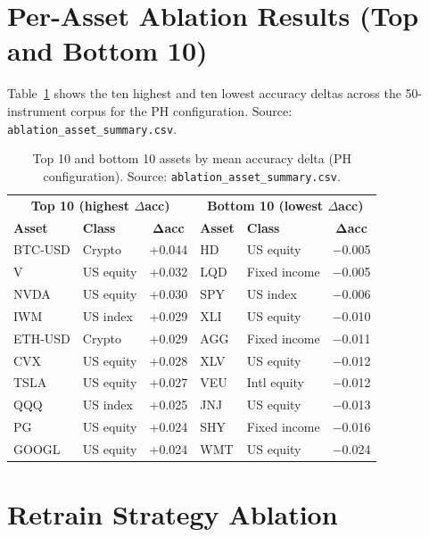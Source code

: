 \begin{appendices}
\section{Per-Asset Ablation Results (Top and Bottom 10)}

Table~\ref{tab:ablation_assets} shows the ten highest and ten lowest accuracy deltas
across the 50-instrument corpus for the PH configuration.  Source:
\texttt{ablation\_asset\_summary.csv}.

\begin{table}[htbp]
  \centering
  \caption{Top 10 and bottom 10 assets by mean accuracy delta (PH configuration).
    Source: \texttt{ablation\_asset\_summary.csv}.}
  \label{tab:ablation_assets}
  \begin{tabular}{llc|llc}
    \hline
    \multicolumn{3}{c|}{\textbf{Top 10 (highest $\Delta$acc)}}
      & \multicolumn{3}{c}{\textbf{Bottom 10 (lowest $\Delta$acc)}} \\
    \textbf{Asset} & \textbf{Class} & $\bm{\Delta}$\textbf{acc}
      & \textbf{Asset} & \textbf{Class} & $\bm{\Delta}$\textbf{acc} \\
    \hline
    BTC-USD & Crypto      & +0.044 & HD   & US equity     & $-$0.005 \\
    V       & US equity   & +0.032 & LQD  & Fixed income  & $-$0.005 \\
    NVDA    & US equity   & +0.030 & SPY  & US index      & $-$0.006 \\
    IWM     & US index    & +0.029 & XLI  & US equity     & $-$0.010 \\
    ETH-USD & Crypto      & +0.029 & AGG  & Fixed income  & $-$0.011 \\
    CVX     & US equity   & +0.028 & XLV  & US equity     & $-$0.012 \\
    TSLA    & US equity   & +0.027 & VEU  & Intl equity   & $-$0.012 \\
    QQQ     & US index    & +0.025 & JNJ  & US equity     & $-$0.013 \\
    PG      & US equity   & +0.024 & SHY  & Fixed income  & $-$0.016 \\
    GOOGL   & US equity   & +0.024 & WMT  & US equity     & $-$0.024 \\
    \hline
  \end{tabular}
\end{table}

\section{Retrain Strategy Ablation}


\end{appendices}
